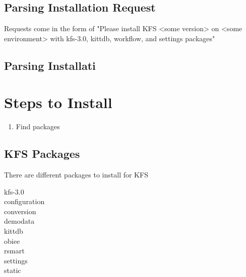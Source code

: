 \documentclass[12pt,notitlepage]{article}
\author{Leo Przybylski \\
\texttt{przybyls@arizona.edu}}
\begin{document}
\W \begin{s5presentation}
\maketitle
\T \tableofcontents

  \W \begin{s5slide}
\W \section{Parsing Installation Request}
Requests come in the form of "Please install KFS <some version> on <some environment> with kfs-3.0,
kittdb, workflow, and settings packages"
\W \end{s5slide}

  \W \begin{s5slide}
\W \section{Parsing Installati}
\W \end{s5slide}

\section{Steps to Install}
\begin{enumerate}
  \item Find packages
\end{enumerate}

  \W \begin{s5slide}
\section{KFS Packages}
There are different packages to install for KFS
\begin{description}
\item[kfs-3.0]
\item[configuration]
\item[conversion]
\item[demodata]
\item[kittdb]
\item[obiee]
\item[rsmart]
\item[settings]
\item[static]
\end{description}
\W \end{s5slide}
  \W \end{s5presentation}
\end{document}
